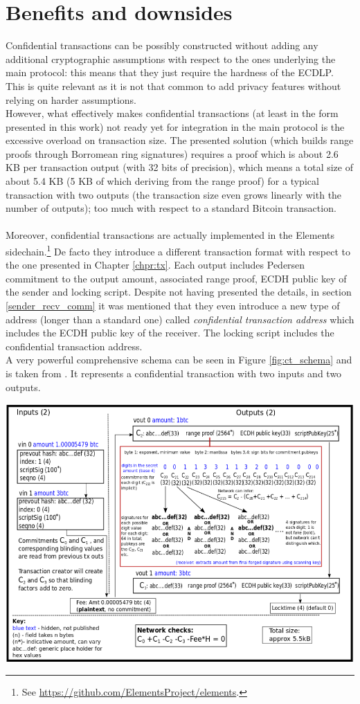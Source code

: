 \section{Benefits and downsides}
\label{sec::final_sec}
Confidential transactions can be possibly constructed without adding any additional cryptographic assumptions with respect to the ones underlying the main protocol: this means that they just require the hardness of the ECDLP. This is quite relevant as it is not that common to add privacy features without relying on harder assumptions.\\
However, what effectively makes confidential transactions (at least in the form presented in this work) not ready yet for integration in the main protocol is the excessive overload on transaction size. The presented solution (which builds range proofs through Borromean ring signatures) requires a proof which is about 2.6 KB per transaction output (with 32 bits of precision), which means a total size of about 5.4 KB (5 KB of which deriving from the range proof) for a typical transaction with two outputs (the transaction size even grows linearly with the number of outputs); too much with respect to a standard Bitcoin transaction.
\\ \ \\
Moreover, confidential transactions are actually implemented in the Elements sidechain.\footnote{See \url{https://github.com/ElementsProject/elements}.} De facto they introduce a different transaction format with respect to the one presented in Chapter \ref{chpr:tx}. Each output includes Pedersen commitment to the output amount, associated range proof, ECDH public key of the sender and locking script. Despite not having presented the details, in section \ref{sender_recv_comm} it was mentioned that they even introduce a new type of address (longer than a standard one) called \textit{confidential transaction address} which includes the ECDH public key of the receiver. The locking script includes the confidential transaction address. \\
A very powerful comprehensive schema can be seen in Figure \ref{fig:ct_schema} and is taken from \cite{GibsonCT}. It represents a confidential transaction with two inputs and two outputs.
\begin{center}
\includegraphics[scale = 0.8]{Images/CT_schema.png}%
\label{fig:ct_schema}
\end{center}